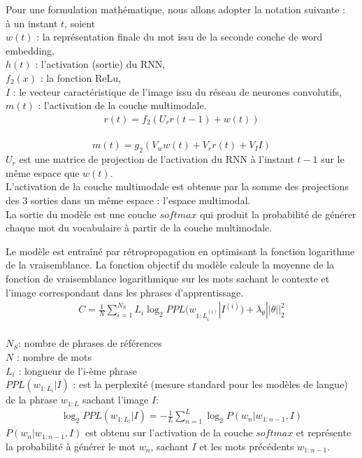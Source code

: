 Pour une formulation mathématique, nous allons adopter la notation suivante :\\
à un instant $t$, soient\\
$w(t)$ : la représentation finale du mot issu de la seconde couche de word embedding,\\
$h(t)$ : l'activation (sortie) du RNN,\\
$f_2(x)$ : la fonction ReLu,\\
$I$ : le vecteur caractéristique de l'image issu du réseau de neurones convolutifs,\\
$m(t)$ : l'activation de la couche multimodale.\\

\begin{eqnarray}
r(t) = f_2(U_r r(t-1)+w(t))
\end{eqnarray}\\
\begin{equation}
\label{equ:multimodalorig}
m(t) = g_2(V_w w(t)+V_r r(t)+ V_I I)
\end{equation}
$U_r$ est une matrice de projection de l'activation du RNN à l'instant $t-1$ sur le même espace
que $w(t)$.\\
L'activation de la couche multimodale est obtenue par la somme des projections des 3 sorties dans un même espace : l'espace multimodal.\\
La sortie du modèle est une couche $softmax$ qui produit la probabilité de générer chaque mot du vocabulaire à partir de la couche multimodale.

Le modèle est entraîné par rétropropagation en optimisant la fonction logarithme de la vraisemblance. La fonction objectif du modèle calcule la moyenne de la fonction  de vraisemblance logarithmique sur les mots sachant le contexte et l'image correspondant dans les phrases d'apprentissage.\\
\begin{eqnarray}
C = \frac{1}{N} \sum_{i=1}^{N_{S}} L_{i} \log_{2} PPL(w_{1:L_{i}^{(i)}}| I^{(i)}) + \lambda_{\theta} ||\theta||^{2}_{2}
\end{eqnarray}\\
$N_{S}$: nombre de phrases de références\\
$N$ : nombre de mots\\
$L_i$ : longueur de l'i-ème phrase\\
$PPL(w_{1:L_{i}}| I)$ :  est la perplexité (mesure standard pour les modèles de langue) de la phrase $w_{1:L}$ sachant l'image $I$:
\begin{eqnarray}
\log_{2} PPL(w_{1:L_{i}}| I) = - \frac{1}{L} \sum_{n=1}^{L} \log_{2} P(w_n|w_{1:n-1},I)
\end{eqnarray} 
$P(w_n|w_{1:n-1},I)$ est obtenu sur l'activation de la couche $softmax$ et représente la probabilité à générer  le mot $w_n$, sachant $I$ et les mots précédents $w_{1:n-1}$.

